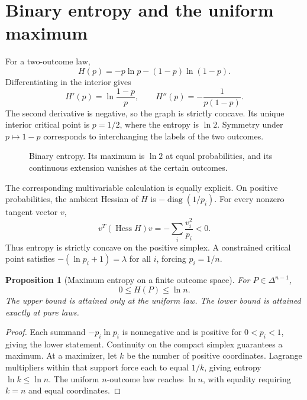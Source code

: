 \documentclass[11pt,oneside,openany]{book}
\newtheorem{proposition}[theorem]{Proposition}
\theoremstyle{definition}
\theoremstyle{remark}
\newcommand{\diag}{\operatorname{diag}}
\numberwithin{equation}{chapter}
\begin{document}
\section{Binary entropy and the uniform maximum}
For a two-outcome law,
\[
H(p)=-p\ln p-(1-p)\ln(1-p).
\]
Differentiating in the interior gives
\begin{equation}\label{eq:binaryentropyderivatives}
H'(p)=\ln\frac{1-p}{p},\qquad
H''(p)=-\frac1{p(1-p)}.
\end{equation}
The second derivative is negative, so the graph is strictly concave. Its unique interior critical point is $p=1/2$, where the entropy is $\ln2$. Symmetry under $p\mapsto1-p$ corresponds to interchanging the labels of the two outcomes.

\begin{figure}[htbp]
\centering
{}
\caption{Binary entropy. Its maximum is $\ln2$ at equal probabilities, and its continuous extension vanishes at the certain outcomes.}
\end{figure}

The corresponding multivariable calculation is equally explicit. On positive probabilities, the ambient Hessian of $H$ is $-\diag(1/p_i)$. For every nonzero tangent vector $v$,
\[
v^T(\operatorname{Hess}H)v=-\sum_i\frac{v_i^2}{p_i}<0.
\]
Thus entropy is strictly concave on the positive simplex. A constrained critical point satisfies $-(\ln p_i+1)=\lambda$ for all $i$, forcing $p_i=1/n$.

\begin{proposition}[Maximum entropy on a finite outcome space]
For $P\in\Delta^{n-1}$,
\[
0\leq H(P)\leq\ln n.
\]
The upper bound is attained only at the uniform law. The lower bound is attained exactly at pure laws.
\end{proposition}
\begin{proof}
Each summand $-p_i\ln p_i$ is nonnegative and is positive for $0<p_i<1$, giving the lower statement. Continuity on the compact simplex guarantees a maximum. At a maximizer, let $k$ be the number of positive coordinates. Lagrange multipliers within that support force each to equal $1/k$, giving entropy $\ln k\leq\ln n$. The uniform $n$-outcome law reaches $\ln n$, with equality requiring $k=n$ and equal coordinates.
\end{proof}
\end{document}
